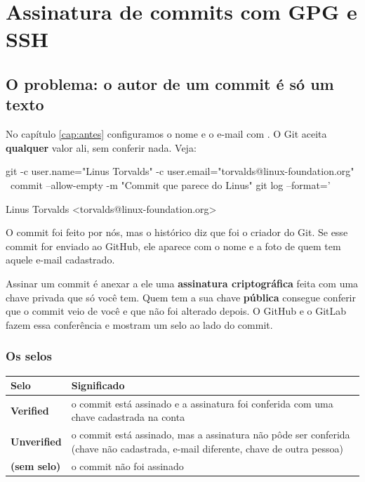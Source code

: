 \chapter{Assinatura de commits com GPG e SSH}
\label{cap:assinatura}

\section{O problema: o autor de um commit é só um texto}

No capítulo \ref{cap:antes} configuramos o nome e o e-mail com . O Git aceita \textbf{qualquer} valor ali, sem conferir nada. Veja:

\begin{terminal}
git -c user.name="Linus Torvalds" -c user.email="torvalds@linux-foundation.org" \
    commit --allow-empty -m "Commit que parece do Linus"
git log --format='%
\end{terminal}
\begin{saida}
Linus Torvalds <torvalds@linux-foundation.org>
\end{saida}

O commit foi feito por nós, mas o histórico diz que foi o criador do Git. Se esse commit for enviado ao GitHub, ele aparece com o nome e a foto de quem tem aquele e-mail cadastrado.

\begin{conceito}
Assinar um commit é anexar a ele uma \textbf{assinatura criptográfica} feita com uma chave privada que só você tem. Quem tem a sua chave \textbf{pública} consegue conferir que o commit veio de você e que não foi alterado depois. O GitHub e o GitLab fazem essa conferência e mostram um selo ao lado do commit.
\end{conceito}

\subsection*{Os selos}

\begin{center}
\renewcommand{\arraystretch}{1.35}
\begin{tabularx}{\linewidth}{@{}>{\bfseries}l X@{}}
\toprule
\textbf{Selo} & \textbf{Significado} \\
\midrule
\color{verdeMB}Verified & o commit está assinado e a assinatura foi conferida com uma chave cadastrada na conta \\
\color{vermelhoAlerta}Unverified & o commit está assinado, mas a assinatura não pôde ser conferida (chave não cadastrada, e-mail diferente, chave de outra pessoa) \\
\textrm{(sem selo)} & o commit não foi assinado \\
\bottomrule
\end{tabularx}
\end{center}

